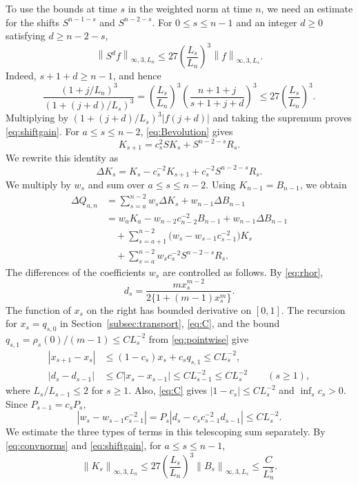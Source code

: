 \documentclass[11pt,letterpaper,reqno]{amsart}
\numberwithin{equation}{section}
\theoremstyle{plain}
\theoremstyle{remark}
\newcommand{\norm}[1]{\left\lVert#1\right\rVert}
\begin{document}
To use the bounds at time $s$ in the weighted norm at time $n$, we need
an estimate for the shifts $S^{n-1-s}$ and $S^{n-2-s}$.
For $0\le s\le n-1$ and an integer $d\ge0$ satisfying $d\ge n-2-s$,
\begin{equation}\label{eq:shiftgain}
 \norm{S^df}_{\infty,3,L_n}
 \le27\left(\frac{L_s}{L_n}\right)^3
       \norm f_{\infty,3,L_s}.
\end{equation}
Indeed, $s+1+d\ge n-1$, and hence
\[
 \frac{(1+j/L_n)^3}{(1+(j+d)/L_s)^3}
 =\left(\frac{L_s}{L_n}\right)^3
  \left(\frac{n+1+j}{s+1+j+d}\right)^3
 \le27\left(\frac{L_s}{L_n}\right)^3.
\]
Multiplying by $(1+(j+d)/L_s)^3|f(j+d)|$ and taking the supremum
proves \eqref{eq:shiftgain}. For $a\le s\le n-2$, \eqref{eq:Bevolution} gives
\[
 K_{s+1}=c_s^2SK_s+S^{n-2-s}R_s.
\]
We rewrite this identity as
\[
 \Delta K_s
 =K_s-c_s^{-2}K_{s+1}
  +c_s^{-2}S^{n-2-s}R_s.
\]
We multiply by $w_s$ and sum over $a\le s\le n-2$.
Using $K_{n-1}=B_{n-1}$, we obtain
\begin{align*}
 \Delta Q_{a,n}
 &=\sum_{s=a}^{n-2}w_s\Delta K_s
   +w_{n-1}\Delta B_{n-1}\\
 &=w_aK_a-w_{n-2}c_{n-2}^{-2}B_{n-1}
   +w_{n-1}\Delta B_{n-1}\\
 &\quad
   +\sum_{s=a+1}^{n-2}
       \bigl(w_s-w_{s-1}c_{s-1}^{-2}\bigr)K_s\\
 &\quad
   +\sum_{s=a}^{n-2}
       w_sc_s^{-2}S^{n-2-s}R_s.
\end{align*}
The differences of the coefficients $w_s$ are controlled as follows.
By \eqref{eq:rhor},
\[
 d_s=\frac{m x_s^{m-2}}{2\{1+(m-1)x_s^m\}}.
\]
The function of $x_s$ on the right has bounded derivative on $[0,1]$.
The recursion for $x_s=q_{s,0}$ in Section~\ref{subsec:transport},
\eqref{eq:C}, and the bound
$q_{s,1}=\rho_s(0)/(m-1)\le CL_s^{-2}$ from
\eqref{eq:pointwise} give
\[
 \begin{aligned}
 |x_{s+1}-x_s|
 &\le(1-c_s)x_s+c_sq_{s,1}
 \le CL_s^{-2},\\
 |d_s-d_{s-1}|
 &\le C|x_s-x_{s-1}|
 \le CL_{s-1}^{-2}
 \le CL_s^{-2}\qquad(s\ge1),
 \end{aligned}
\]
where $L_s/L_{s-1}\le2$ for $s\ge1$.
Also, \eqref{eq:C} gives $|1-c_s|\le CL_s^{-2}$ and
$\inf_s c_s>0$.
Since $P_{s-1}=c_sP_s$,
\[
 |w_s-w_{s-1}c_{s-1}^{-2}|
 =P_s|d_s-c_sc_{s-1}^{-2}d_{s-1}|\le CL_s^{-2}.
\]
We estimate the three types of terms in this telescoping sum separately. By
\eqref{eq:convnorms} and \eqref{eq:shiftgain}, for $a\le s\le n-1$,
\[
 \norm{K_s}_{\infty,3,L_n}
 \le27\left(\frac{L_s}{L_n}\right)^3
       \norm{B_s}_{\infty,3,L_s}
 \le \frac C{L_n^3}.
\]
\end{document}
